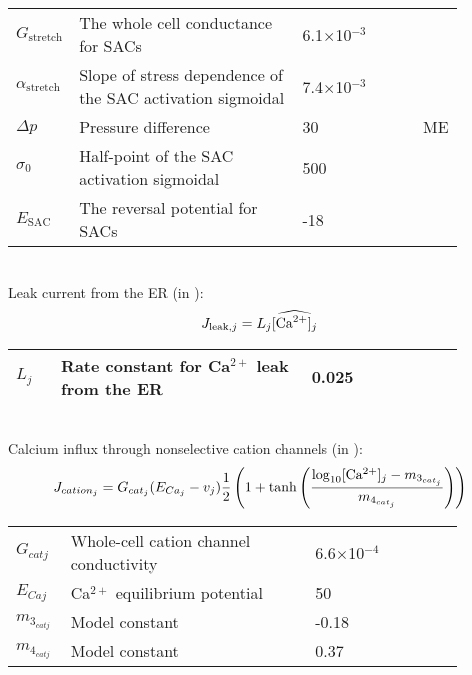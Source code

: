 \begin{table}[h!]
\centering
\begin{tabular}{ p{0.09\linewidth}  >{\footnotesize} p{0.5\linewidth}  >{\footnotesize} p{0.27\linewidth} >{\footnotesize} p{0.03\linewidth} }
\hline
$G_{\text{stretch}}$      		& The whole cell conductance for SACs						& 6.1$\times$10$^{-3}$ \uMpmVs	&\cite{Koenigsberger2006} \\
$\alpha_{\text{stretch}}$      & Slope of stress dependence of the SAC activation sigmoidal	& 7.4$\times$10$^{-3}$ \pmmHg	&\cite{Koenigsberger2006} \\
$ \Delta p $			& Pressure difference										& 30 \mmHg			& ME \\
$\sigma_{0}$      		& Half-point of the SAC activation sigmoidal				& 500 \mmHg			&\cite{Koenigsberger2006} \\
$E_{\text{SAC}}$      			& The reversal potential for SACs							& -18 \mV			&\cite{Koenigsberger2006} \\
\hline
\end{tabular}
\label{tab:Jstretchj}
\end{table}
\\
%
Leak current from the ER (in \uMs):
\begin{equation} \label{eq:JERleakj}
J_{\text{leak},j} = L_{j}\widehat{\text{[Ca$^{2+}$]$_j$}}
\end{equation}
%
\begin{table}[h!]
\centering
\begin{tabular}{ p{0.09\linewidth}  >{\footnotesize} p{0.5\linewidth}  >{\footnotesize} p{0.27\linewidth} >{\footnotesize} p{0.03\linewidth} }
\hline
$L_{j}$      			& Rate constant for Ca$^{2+}$ leak from the ER 		 & 0.025	\pers			& \cite{Koenigsberger2006} \\
\hline
\end{tabular}
\label{tab:JKj}
\end{table}
\\
%
Calcium influx through nonselective cation channels (in \uMs):
\begin{equation} \label{eq:Jcationj}
J_{cation_{j}} = G_{cat_{j}} (E_{Ca_{j}} - v_{j}) \frac{1}{2} \left(   1+ \tanh \left(  \frac{\mathrm{log}_{10} \text{[Ca$^{2+}$]$_j$} - m_{3_{cat_{j}}} }    {m_{4_{cat_{j}}}}   \right)      \right) 
\end{equation}
%
%
\begin{table}[h!]
\centering
\begin{tabular}{ p{0.09\linewidth}  >{\footnotesize} p{0.5\linewidth}  >{\footnotesize} p{0.27\linewidth} >{\footnotesize} p{0.03\linewidth} }
\hline
$G_{cat j}$      		& Whole-cell cation channel conductivity						 	& 6.6$\times$10$^{-4}$ \uMpmVs	& \cite{Koenigsberger2006} \\
$E_{Caj}$      			& Ca$^{2+}$ equilibrium potential								 	& 50 \mV		& \cite{Koenigsberger2006} \\

$m_{3_{catj}}$      	& Model constant				 	& -0.18 \uM		& \cite{Koenigsberger2006} \\
$m_{4_{catj}}$      	& Model constant					& 0.37  \uM		& \cite{Koenigsberger2006} \\
\hline
\end{tabular}
\label{tab:Jcationj}
\end{table}
